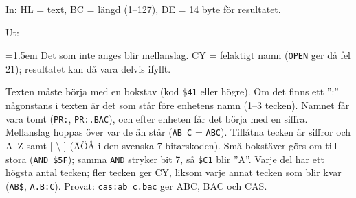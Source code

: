 \begin{Listing}
\Gap
{}
\begin{Note}\par\noindent In:  HL = text, BC = längd (1–127), DE = 14 byte för resultatet.\par
\par\noindent Ut:\par
\begin{Verb}
\end{Verb}
\par\noindent\hangindent=1.5em Det som inte anges blir mellanslag. CY = felaktigt namn (\hyperlink{l:OPEN}{\texttt{OPEN}} ger då fel 21); resultatet kan då vara delvis ifyllt.\par
\par\noindent Texten måste börja med en bokstav (kod \texttt{\$41} eller högre). Om det finns ett ”:” någonstans i texten är det som står före enhetens namn (1–3 tecken). Namnet får vara tomt (\texttt{PR:}, \texttt{PR:.BAC}), och efter enheten får det börja med en siffra. Mellanslag hoppas över var de än står (\texttt{AB C} = \texttt{ABC}). Tillåtna tecken är siffror och A–Z samt [ \textbackslash{} ] (ÄÖÅ i den svenska 7-bitarskoden). Små bokstäver görs om till stora (\texttt{AND \$5F}); samma \texttt{AND} stryker bit 7, så \texttt{\$C1} blir ”A”. Varje del har ett högsta antal tecken; fler tecken ger CY, liksom varje annat tecken som blir kvar (\texttt{AB\$}, \texttt{A.B:C}). Provat: \texttt{cas:ab c.bac} ger ABC, BAC och CAS.\par\end{Note}

\end{Listing}
